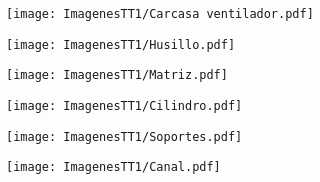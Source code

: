 \documentclass[14pt,oneside]{extarticle} %
\begin{document}
\begin{figure}
    \centering
    \texttt{[image: ImagenesTT1/Carcasa ventilador.pdf]}
\end{figure}

\begin{figure}
    \centering
    \texttt{[image: ImagenesTT1/Husillo.pdf]}
\end{figure}

\begin{figure}
    \centering
    \texttt{[image: ImagenesTT1/Matriz.pdf]}
\end{figure}

\begin{figure}
    \centering
    \texttt{[image: ImagenesTT1/Cilindro.pdf]}
\end{figure}

\begin{figure}
    \centering
    \texttt{[image: ImagenesTT1/Soportes.pdf]}
\end{figure}

\begin{figure}
    \centering
    \texttt{[image: ImagenesTT1/Canal.pdf]}
\end{figure}

\clearpage
\newpage
\end{document}
